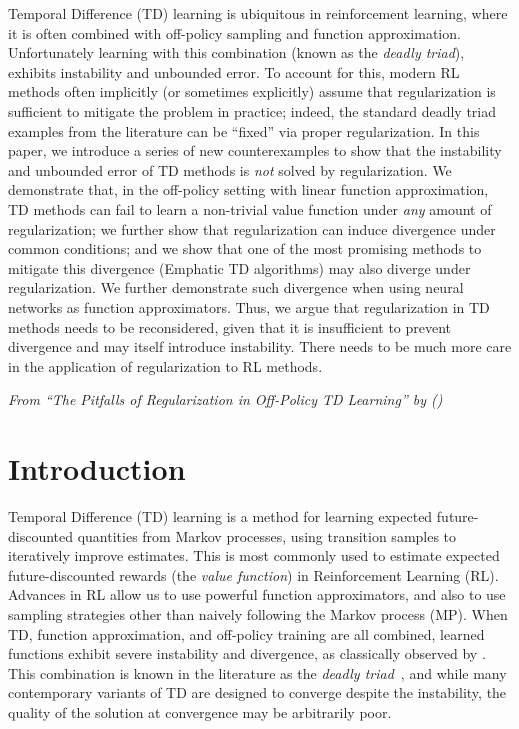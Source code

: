 Temporal Difference (TD) learning is ubiquitous in reinforcement learning, where it is often combined with off-policy sampling and function approximation.  Unfortunately learning with this combination (known as the \emph{deadly triad}), exhibits instability and unbounded error.  To account for this, modern RL methods often implicitly (or sometimes explicitly) assume that regularization is sufficient to mitigate the problem in practice; indeed, the standard deadly triad examples from the literature can be ``fixed'' via proper regularization. In this paper, we introduce a series of new counterexamples to show that the instability and unbounded error of TD methods is \emph{not} solved by regularization. We demonstrate that, in the off-policy setting with linear function approximation, TD methods can fail to learn a non-trivial value function under \emph{any} amount of regularization; we further show that regularization can induce divergence under common conditions; and we show that one of the most promising methods to mitigate this divergence (Emphatic TD algorithms) may also diverge under regularization. We further demonstrate such divergence when using neural networks as function approximators.  Thus, we argue that regularization in TD methods needs to be reconsidered, given that it is insufficient to prevent divergence and may itself introduce instability. There needs to be much more care in the application of regularization to RL methods.

\emph{From ``The Pitfalls of Regularization in Off-Policy TD Learning'' by \citeauthor{manek2022pitfalls} (\citeyear{manek2022pitfalls})}


\section{Introduction}
Temporal Difference (TD) learning is a method for learning expected future-discounted quantities from Markov processes, using transition samples to iteratively improve estimates. This is most commonly used to estimate expected future-discounted rewards (the \emph{value function}) in Reinforcement Learning (RL). Advances in RL allow us to use powerful function approximators, and also to use sampling strategies other than naively following the Markov process (MP). When TD, function approximation, and off-policy training are all combined, learned functions exhibit severe instability and divergence, as classically observed by \citet{baird1993counterexample,tsitsiklis1996analysis}. This combination is known in the literature as the \emph{deadly triad}~\cite[pg.~264]{sutton2020reinforcement}, and while many contemporary variants of TD are designed to converge despite the instability, the quality of the solution at convergence may be arbitrarily poor.

